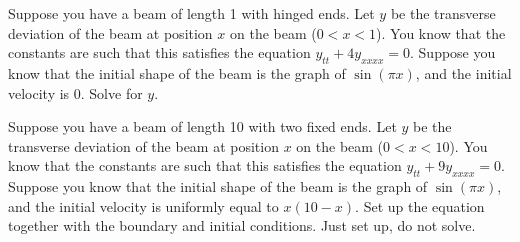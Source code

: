 \documentclass{ximera}
\begin{document}

\begin{exercise}
    Suppose you have a beam of length 1 with hinged ends.  Let $y$ be the transverse deviation of the beam at position $x$ on the beam ($0 < x < 1$). You know that the constants are such that this satisfies the equation $y_{tt} + 4 y_{xxxx} = 0$.   Suppose you know that the initial shape of the beam is the graph of $\sin (\pi x)$, and the initial velocity is 0.  Solve for $y$.
\end{exercise}

\begin{exercise}
    Suppose you have a beam of length 10 with two fixed ends.  Let $y$ be the transverse deviation of the beam at position $x$ on the beam ($0 < x < 10$). You know that the constants are such that this satisfies the equation $y_{tt} + 9 y_{xxxx} = 0$.   Suppose you know that the initial shape of the beam is the graph of $\sin(\pi x)$, and the initial velocity is uniformly equal to $x(10-x)$. Set up the equation together with the boundary and initial conditions.  Just set up, do not solve.
\end{exercise}
\end{document}
